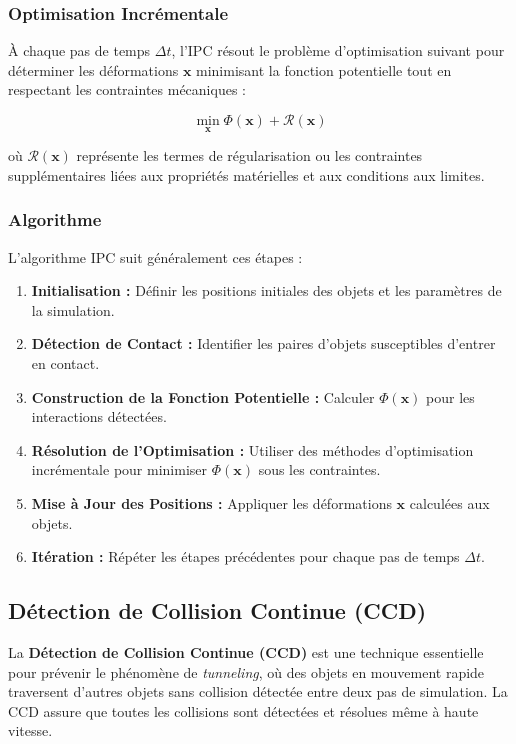 \subsubsection{Optimisation Incrémentale}

À chaque pas de temps \( \Delta t \), l'IPC résout le problème d'optimisation suivant pour déterminer les déformations \( \mathbf{x} \) minimisant la fonction potentielle tout en respectant les contraintes mécaniques :

\[
\min_{\mathbf{x}} \Phi(\mathbf{x}) + \mathcal{R}(\mathbf{x})
\]

où \( \mathcal{R}(\mathbf{x}) \) représente les termes de régularisation ou les contraintes supplémentaires liées aux propriétés matérielles et aux conditions aux limites.

\subsubsection{Algorithme}

L'algorithme IPC suit généralement ces étapes :
\begin{enumerate}
    \item \textbf{Initialisation :} Définir les positions initiales des objets et les paramètres de la simulation.
    \item \textbf{Détection de Contact :} Identifier les paires d'objets susceptibles d'entrer en contact.
    \item \textbf{Construction de la Fonction Potentielle :} Calculer \( \Phi(\mathbf{x}) \) pour les interactions détectées.
    \item \textbf{Résolution de l'Optimisation :} Utiliser des méthodes d'optimisation incrémentale pour minimiser \( \Phi(\mathbf{x}) \) sous les contraintes.
    \item \textbf{Mise à Jour des Positions :} Appliquer les déformations \( \mathbf{x} \) calculées aux objets.
    \item \textbf{Itération :} Répéter les étapes précédentes pour chaque pas de temps \( \Delta t \).
\end{enumerate}

\subsection{Détection de Collision Continue (CCD)}

La \textbf{Détection de Collision Continue (CCD)} est une technique essentielle pour prévenir le phénomène de \textit{tunneling}, où des objets en mouvement rapide traversent d'autres objets sans collision détectée entre deux pas de simulation. La CCD assure que toutes les collisions sont détectées et résolues même à haute vitesse.

